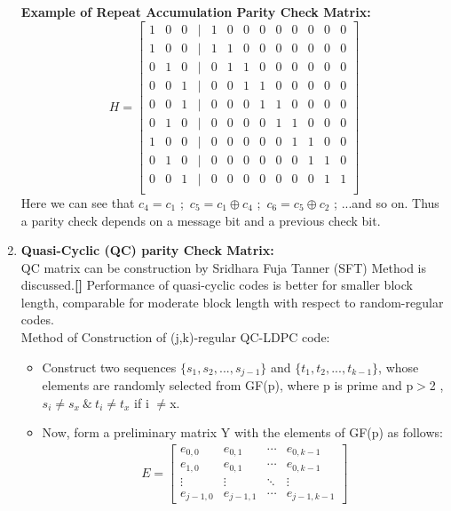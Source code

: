 \documentclass[twopage,12pt,a4paper]{report}
\begin{document}
\begin{raggedright}
\begin{enumerate}
 
\textbf{Example of Repeat Accumulation Parity Check Matrix:} \\
  \[ H=
 \left[ \begin{array}{ccccccccccccc}
1 & 0 & 0 &| & 1 & 0 & 0 & 0 & 0 & 0 & 0 & 0 & 0 \\
1 & 0 & 0 &|& 1 & 1 & 0 & 0 & 0 & 0 & 0 & 0 & 0 \\
0 & 1 & 0 &|& 0 & 1 & 1 & 0 & 0 & 0 & 0 & 0 & 0 \\
0 & 0 & 1 &|& 0 & 0 & 1 & 1 & 0 & 0 & 0 & 0 & 0 \\
0 & 0 & 1 &|& 0 & 0 & 0 & 1 & 1 & 0 & 0 & 0 & 0 \\
0 & 1 & 0 &|& 0 & 0 & 0 & 0 & 1 & 1 & 0 & 0 & 0\\
1 & 0 & 0 &|& 0 & 0 & 0 & 0 & 0 & 1 & 1 & 0 & 0 \\
0 & 1 & 0 &|& 0 & 0 & 0 & 0 & 0 & 0 & 1 & 1 & 0 \\
0 & 0 & 1 &|& 0 & 0 & 0 & 0 & 0 & 0 & 0 & 1 & 1 \\ \end{array} \right]  
\] 
Here we can see that $c_4 = c_1$ ;\ $c_5 = c_1 \oplus c_4$ ;\ $c_6 = c_5 \oplus c_2$ ; ...and so on. Thus a parity check depends on a message bit and a previous check bit.



\item \textbf{Quasi-Cyclic (QC) parity Check Matrix: }\\
QC matrix can be construction by 
Sridhara Fuja Tanner (SFT) Method is discussed.\textbf{[]} Performance of quasi-cyclic codes is better for smaller block length, comparable for moderate block length with respect to random-regular codes.\\
Method of Construction of (j,k)-regular QC-LDPC code:
\begin{itemize}
\item Construct two sequences $\{s_1,s_2,...,s_{j-1}\}$ and $\{t_1,t_2,...,t_{k-1}\}$, whose elements are randomly selected from GF(p), where p is prime and p$>$2 , $s_i \neq s_x \ \& \ t_i \neq t_x$ if i $\neq$x.
\item Now, form a preliminary matrix Y with the elements of GF(p) as follows:
\begin{align}
 E= \left[ \begin{array}{cccc}
e_{0,0} & e_{0,1} & \cdots & e_{0,k-1} \\
e_{1,0} & e_{0,1} & \cdots & e_{0,k-1} \\
\vdots & \vdots & \ddots & \vdots \\
e_{j-1,0} & e_{j-1,1} & \cdots & e_{j-1,k-1} 
\end{array} \right] 
\end{align}
 

\end{itemize}
\end{enumerate}
\end{raggedright}
\end{document}
